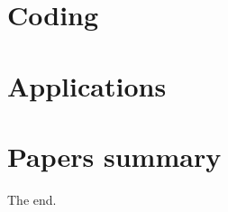\documentclass[oneside]{book}
\begin{document}
\part{Coding}\label{prt:coding}
% 
%
%
%



%


\part{Applications}\label{prt:apps}
%
%

\part{Papers summary}\label{prt:papers}

The end.  %


\clearpage
\end{document}

